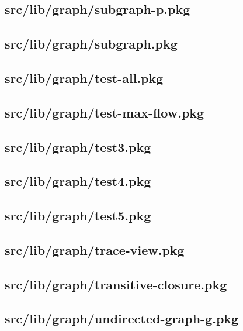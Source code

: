 \subsection{src/lib/graph/subgraph-p.pkg}


\subsection{src/lib/graph/subgraph.pkg}


\subsection{src/lib/graph/test-all.pkg}


\subsection{src/lib/graph/test-max-flow.pkg}


\subsection{src/lib/graph/test3.pkg}


\subsection{src/lib/graph/test4.pkg}


\subsection{src/lib/graph/test5.pkg}


\subsection{src/lib/graph/trace-view.pkg}


\subsection{src/lib/graph/transitive-closure.pkg}


\subsection{src/lib/graph/undirected-graph-g.pkg}


